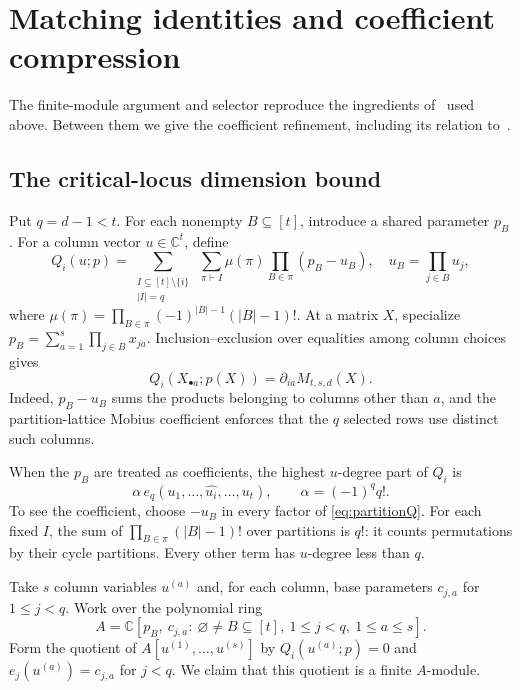 \documentclass[11pt]{article}
\theoremstyle{remark}\newtheorem{remark}[theorem]{Remark}
\newcommand{\C}{\mathbb C}
\begin{document}
\appendix
\section{Matching identities and coefficient compression}\label{app:matching}

The finite-module argument and selector reproduce the ingredients
of~\cite[Chapter 5]{OAI} used above. Between them we give the
coefficient refinement, including its relation to~\cite{Guo}.

\subsection{The critical-locus dimension bound}

Put $q=d-1<t$. For each nonempty $B\subseteq[t]$, introduce a shared
parameter $p_B$. For a column vector $u\in\C^t$, define
\begin{equation}\label{eq:partitionQ}
 Q_i(u;p)=\sum_{\substack{I\subseteq[t]\setminus\{i\}\\|I|=q}}
       \ \sum_{\pi\vdash I}\mu(\pi)
                  \prod_{B\in\pi}(p_B-u_B),
 \quad
 u_B=\prod_{j\in B}u_j,
\end{equation}
where
$\mu(\pi)=\prod_{B\in\pi}(-1)^{|B|-1}(|B|-1)!$.
At a matrix $X$, specialize
$p_B=\sum_{a=1}^s\prod_{j\in B}x_{ja}$.
Inclusion--exclusion over equalities among column choices gives
\[
 Q_i(X_{\bullet a};p(X))=\partial_{ia}M_{t,s,d}(X).
\]
Indeed, $p_B-u_B$ sums the products belonging to columns other than
$a$, and the partition-lattice Mobius coefficient enforces that the
$q$ selected rows use distinct such columns.

When the $p_B$ are treated as coefficients, the highest $u$-degree
part of $Q_i$ is
\begin{equation}\label{eq:leadingQ}
 \alpha\,e_q(u_1,\ldots,\widehat{u_i},\ldots,u_t),
 \qquad \alpha=(-1)^q q!.
\end{equation}
To see the coefficient, choose $-u_B$ in every factor of
\eqref{eq:partitionQ}. For each fixed $I$, the sum of
$\prod_{B\in\pi}(|B|-1)!$ over partitions is $q!$: it counts
permutations by their cycle partitions. Every other term has
$u$-degree less than $q$.

Take $s$ column variables $u^{(a)}$ and, for each column, base
parameters $c_{j,a}$ for $1\le j<q$. Work over the polynomial ring
\[
 A=\C[p_B,\ c_{j,a}:\ \varnothing\ne B\subseteq[t],\
                         1\le j<q,\ 1\le a\le s].
\]
Form the quotient of $A[u^{(1)},\ldots,u^{(s)}]$ by
$Q_i(u^{(a)};p)=0$ and $e_j(u^{(a)})=c_{j,a}$ for $j<q$.
We claim that this quotient is a finite $A$-module.
\end{document}

